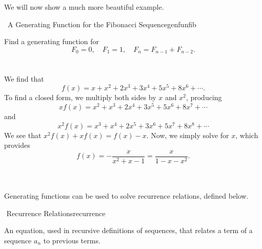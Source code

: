         \vphantom
        \\
        \\
        We will now show a much more beautiful example.
        \begin{example}{\Difficulty\,\Difficulty\,\,A Generating Function for the Fibonacci Sequence}{genfunfib}
        
            Find a generating function for
            \begin{equation*}
                F_0=0,\quad F_1=1, \quad F_n=F_{n-1}+F_{n-2}.
            \end{equation*}
            \\
            \\
            We find that
            \begin{equation*}
                f(x)=x+x^2+2x^3+3x^4+5x^5+8x^6+\cdots.
            \end{equation*}
            To find a closed form, we multiply both sides by \(x\) and \(x^2\), producing
            \begin{equation*}
                xf(x)=x^2+x^3+2x^4+3x^5+5x^6+8x^7+\cdots
            \end{equation*}
            and
            \begin{equation*}
                x^2f(x)=x^3+x^4+2x^5+3x^6+5x^7+8x^8+\cdots
            \end{equation*}
            We see that \(x^2f(x)+xf(x)=f(x)-x\). Now, we simply solve for \(x\), which provides
            \begin{equation*}
                f(x)=-\frac{x}{x^2+x-1}=\frac{x}{1-x-x^2}.
            \end{equation*}
        
        \end{example}
        \vphantom
        \\
        \\
        Generating functions can be used to solve recurrence relations, defined below.
        \begin{definition}{\Stop\,\,Recurrence Relations}{recurrence}
        
            An equation, used in recursive definitions of sequences, that relates a term of a sequence \(a_n\) to previous terms.
            
        \end{definition}
        \pagebreak
        \vphantom
        \\
        \\
